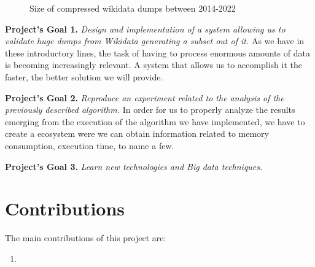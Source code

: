 \begin{figure}[h]
    \centering
    \caption{Size of compressed wikidata dumps between 2014-2022~\cite{web:wikidata:dumps}}
    \label{fig:dumps}
\end{figure}

\textbf{Project's Goal 1.} \textit{Design and implementation of a system allowing us to validate huge dumps from Wikidata generating a subset out of it.} As we have in these introductory lines, the task of having to process enormous amounts of data is becoming increasingly relevant. A system that allows us to accomplish it the faster, the better solution we will provide.

\textbf{Project's Goal 2.} \textit{Reproduce an experiment related to the analysis of the previously described algorithm.} In order for us to properly analyze the results emerging from the execution of the algorithm we have implemented, we have to create a ecosystem were we can obtain information related to memory consumption, execution time, to name a few.

\textbf{Project's Goal 3.} \textit{Learn new technologies and Big data techniques.}

\section{Contributions}

The main contributions of this project are:

\begin{enumerate}
    \item
\end{enumerate}

